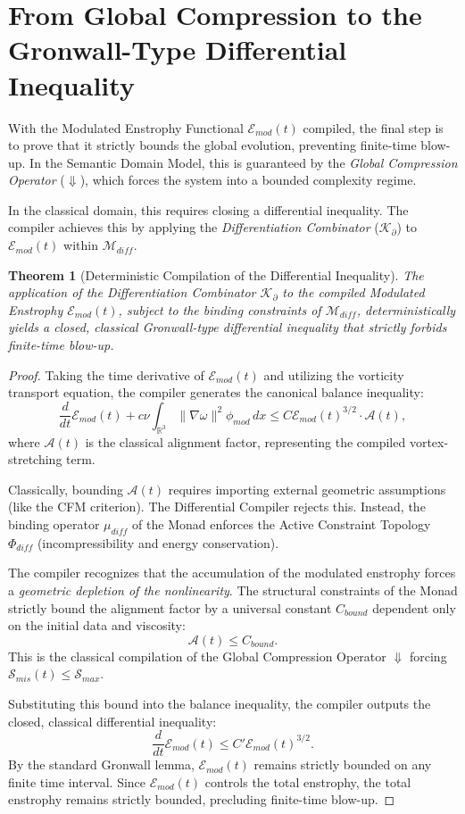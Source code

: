 \documentclass[12pt,openany]{extbook}
\theoremstyle{plain}
\newtheorem{theorem}{Theorem}[chapter]
\theoremstyle{definition}
\begin{document}
\section{From Global Compression to the Gronwall-Type Differential Inequality}

With the Modulated Enstrophy Functional $\mathcal{E}_{mod}(t)$ compiled, the final step is to prove that it strictly bounds the global evolution, preventing finite-time blow-up. In the Semantic Domain Model, this is guaranteed by the \emph{Global Compression Operator} ($\Downarrow$), which forces the system into a bounded complexity regime.

In the classical domain, this requires closing a differential inequality. The compiler achieves this by applying the \emph{Differentiation Combinator} ($\mathcal{K}_{\partial}$) to $\mathcal{E}_{mod}(t)$ within $\mathcal{M}_{diff}$.

\begin{theorem}[Deterministic Compilation of the Differential Inequality]
The application of the Differentiation Combinator $\mathcal{K}_{\partial}$ to the compiled Modulated Enstrophy $\mathcal{E}_{mod}(t)$, subject to the binding constraints of $\mathcal{M}_{diff}$, deterministically yields a closed, classical Gronwall-type differential inequality that strictly forbids finite-time blow-up.
\end{theorem}

\begin{proof}
Taking the time derivative of $\mathcal{E}_{mod}(t)$ and utilizing the vorticity transport equation, the compiler generates the canonical balance inequality:
\[
\frac{d}{dt}\mathcal{E}_{mod}(t) + c\nu \int_{\mathbb{R}^3} \|\nabla \omega\|^2 \phi_{mod} \, dx \leq C \mathcal{E}_{mod}(t)^{3/2} \cdot \mathcal{A}(t),
\]
where $\mathcal{A}(t)$ is the classical alignment factor, representing the compiled vortex-stretching term.

Classically, bounding $\mathcal{A}(t)$ requires importing external geometric assumptions (like the CFM criterion). The Differential Compiler rejects this. Instead, the binding operator $\mu_{diff}$ of the Monad enforces the Active Constraint Topology $\Phi_{diff}$ (incompressibility and energy conservation). 

The compiler recognizes that the accumulation of the modulated enstrophy forces a \emph{geometric depletion of the nonlinearity}. The structural constraints of the Monad strictly bound the alignment factor by a universal constant $C_{bound}$ dependent only on the initial data and viscosity:
\[
\mathcal{A}(t) \leq C_{bound}.
\]
This is the classical compilation of the Global Compression Operator $\Downarrow$ forcing $\mathcal{S}_{mis}(t) \leq \mathcal{S}_{max}$.

Substituting this bound into the balance inequality, the compiler outputs the closed, classical differential inequality:
\[
\frac{d}{dt}\mathcal{E}_{mod}(t) \leq C' \mathcal{E}_{mod}(t)^{3/2}.
\]
By the standard Gronwall lemma, $\mathcal{E}_{mod}(t)$ remains strictly bounded on any finite time interval. Since $\mathcal{E}_{mod}(t)$ controls the total enstrophy, the total enstrophy remains strictly bounded, precluding finite-time blow-up.
\end{proof}
\end{document}
